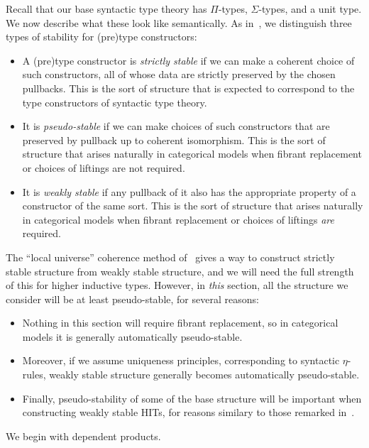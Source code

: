\documentclass{amsart}
\begin{document}
Recall that our base syntactic type theory has $\Pi$-types, $\Sigma$-types, and a unit type.
We now describe what these look like semantically.
As in~\cite{lw:localuniv}, we distinguish three types of stability for (pre)type constructors:
\begin{itemize}
\item A (pre)type constructor is \emph{strictly stable} if we can make a coherent choice of such constructors, all of whose data are strictly preserved by the chosen pullbacks.
  This is the sort of structure that is expected to correspond to the type constructors of syntactic type theory.
\item It is \emph{pseudo-stable} if we can make choices of such constructors that are preserved by pullback up to coherent isomorphism.
  This is the sort of structure that arises naturally in categorical models when fibrant replacement or choices of liftings are not required.
\item It is \emph{weakly stable} if any pullback of it also has the appropriate property of a constructor of the same sort.
  This is the sort of structure that arises naturally in categorical models when fibrant replacement or choices of liftings \emph{are} required.
\end{itemize}
The ``local universe'' coherence method of~\cite{lw:localuniv} gives a way to construct strictly stable structure from weakly stable structure, and we will need the full strength of this for higher inductive types.
However, in \emph{this} section, all the structure we consider will be at least pseudo-stable, for several reasons:
\begin{itemize}
\item Nothing in this section will require fibrant replacement, so in categorical models it is generally automatically pseudo-stable.
\item Moreover, if we assume uniqueness principles, corresponding to syntactic $\eta$-rules, weakly stable structure generally becomes automatically pseudo-stable.
\item Finally, pseudo-stability of some of the base structure will be important when constructing weakly stable HITs, for reasons similary to those remarked in~\cite[3.4.4.9--10]{lw:localuniv}.
\end{itemize}
We begin with dependent products.
\end{document}
